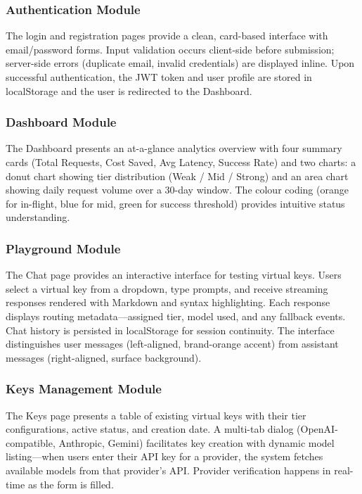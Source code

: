 \documentclass[12pt,a4paper]{report}
\begin{document}
\subsubsection{Authentication Module}
The login and registration pages provide a clean, card-based interface with email/password forms. Input validation occurs client-side before submission; server-side errors (duplicate email, invalid credentials) are displayed inline. Upon successful authentication, the JWT token and user profile are stored in localStorage and the user is redirected to the Dashboard.

\subsubsection{Dashboard Module}
The Dashboard presents an at-a-glance analytics overview with four summary cards (Total Requests, Cost Saved, Avg Latency, Success Rate) and two charts: a donut chart showing tier distribution (Weak / Mid / Strong) and an area chart showing daily request volume over a 30-day window. The colour coding (orange for in-flight, blue for mid, green for success threshold) provides intuitive status understanding.

\subsubsection{Playground Module}
The Chat page provides an interactive interface for testing virtual keys. Users select a virtual key from a dropdown, type prompts, and receive streaming responses rendered with Markdown and syntax highlighting. Each response displays routing metadata---assigned tier, model used, and any fallback events. Chat history is persisted in localStorage for session continuity. The interface distinguishes user messages (left-aligned, brand-orange accent) from assistant messages (right-aligned, surface background).

\subsubsection{Keys Management Module}
The Keys page presents a table of existing virtual keys with their tier configurations, active status, and creation date. A multi-tab dialog (OpenAI-compatible, Anthropic, Gemini) facilitates key creation with dynamic model listing---when users enter their API key for a provider, the system fetches available models from that provider's API. Provider verification happens in real-time as the form is filled.
\end{document}
